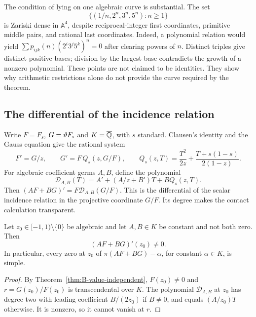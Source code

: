 The condition of lying on one algebraic curve is substantial. The set
\[
                  \{(1/n,2^n,3^n,5^n):n\ge1\}
\]
is Zariski dense in $\mathbb A^4$, despite reciprocal-integer first
coordinates, primitive middle pairs, and rational last coordinates.
Indeed, a polynomial relation would yield
$\sum p_{ijk}(n)(2^i3^j5^k)^n=0$ after clearing powers of $n$.
Distinct triples give distinct positive bases; division by the largest
base contradicts the growth of a nonzero polynomial. These points are
not claimed to be identities. They show why arithmetic restrictions
alone do not provide the curve required by the theorem.

\subsection{The differential of the incidence relation}

Write $F=F_s$, $G=\vartheta F_s$ and $K=\overline{\mathbb Q}$, with $s$ standard.
Clausen's identity and the Gauss equation give the rational system
\begin{equation}\label{eq:C-standard-two-value-system}
 F'=G/z,\qquad G'=F\,Q_s(z,G/F),\qquad
 Q_s(z,T)=\frac{T^2}{2z}+\frac{T+s(1-s)}{2(1-z)}.
\end{equation}
For algebraic coefficient germs $A,B$, define the polynomial
\begin{equation}\label{rev:eq:contact-operator}
          \mathcal D_{A,B}(T)=A'+(A/z+B')T+BQ_s(z,T).
\end{equation}
Then $(AF+BG)'=F\mathcal D_{A,B}(G/F)$. This is the differential
of the scalar incidence relation in the projective coordinate $G/F$.
Its degree makes the contact calculation transparent.

\begin{proposition}\label{prop:C-slope-transverse}
Let $z_0\in[-1,1)\setminus\{0\}$ be algebraic and let
$A,B\in K$ be constant and not both zero. Then
\[
                          (AF+BG)'(z_0)\ne0.
\]
In particular, every zero at $z_0$ of $\pi(AF+BG)-\alpha$, for
constant $\alpha\in K$, is simple.
\end{proposition}
\begin{proof}
By Theorem~\ref{thm:B-value-independent}, $F(z_0)\ne0$ and
$r=G(z_0)/F(z_0)$ is transcendental over $K$.
The polynomial $\mathcal D_{A,B}$ at $z_0$ has degree two with leading
coefficient $B/(2z_0)$ if $B\ne0$, and equals $(A/z_0)T$ otherwise.
It is nonzero, so it cannot vanish at $r$.
\end{proof}


